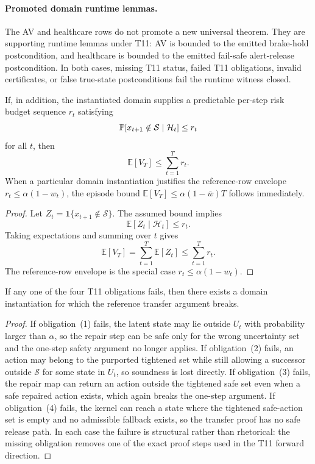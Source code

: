 \paragraph{Promoted domain runtime lemmas.}
The AV and healthcare rows do not promote a new universal theorem.  They are
supporting runtime lemmas under T11: AV is bounded to the emitted
brake-hold postcondition, and healthcare is bounded to the emitted fail-safe
alert-release postcondition.  In both cases, missing T11 status, failed T11
obligations, invalid certificates, or false true-state postconditions fail the
runtime witness closed.

\begin{corollary}
\label{cor:t11-aggregation}
If, in addition, the instantiated domain supplies a predictable per-step risk
budget sequence $r_t$ satisfying
\[
  \operatorname{\mathbb{P}}[x_{t+1}\notin\mathcal{S}\mid \mathcal{H}_t] \le r_t
\]
for all $t$, then
\[
  \mathbb{E}[V_T] \le \sum_{t=1}^T r_t.
\]
When a particular domain instantiation justifies the reference-row envelope
$r_t \le \alpha(1-w_t)$, the episode bound
$\mathbb{E}[V_T] \le \alpha(1-\bar{w})T$ follows immediately.
\end{corollary}

\begin{proof}
Let $Z_t=\mathbf{1}\{x_{t+1}\notin\mathcal{S}\}$.  The assumed bound implies
\[
  \mathbb{E}[Z_t \mid \mathcal{H}_t] \le r_t.
\]
Taking expectations and summing over $t$ gives
\[
  \mathbb{E}[V_T]
  =
  \sum_{t=1}^T \mathbb{E}[Z_t]
  \le
  \sum_{t=1}^T r_t.
\]
The reference-row envelope is the special case $r_t \le \alpha(1-w_t)$.
\end{proof}

\begin{proposition}
\label{prop:t11-counterexamples}
If any one of the four T11 obligations fails, then there exists a domain
instantiation for which the reference transfer argument breaks.
\end{proposition}

\begin{proof}
If obligation~(1) fails, the latent state may lie outside $U_t$ with
probability larger than $\alpha$, so the repair step can be safe only for the
wrong uncertainty set and the one-step safety argument no longer applies.
If obligation~(2) fails, an action may belong to the purported tightened set
while still allowing a successor outside $\mathcal{S}$ for some state in
$U_t$, so soundness is lost directly.  If obligation~(3) fails, the repair map
can return an action outside the tightened safe set even when a safe repaired
action exists, which again breaks the one-step argument.  If obligation~(4)
fails, the kernel can reach a state where the tightened safe-action set is
empty and no admissible fallback exists, so the transfer proof has no safe
release path.  In each case the failure is structural rather than rhetorical:
the missing obligation removes one of the exact proof steps used in the T11
forward direction.
\end{proof}

